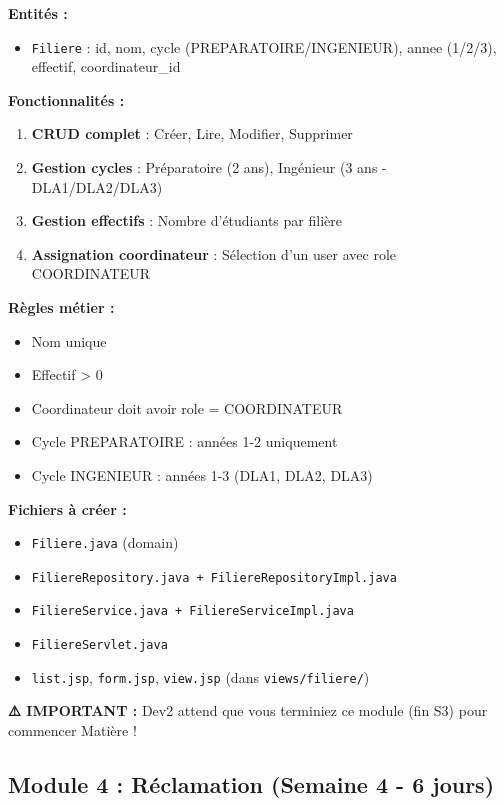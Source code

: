 \documentclass[11pt,a4paper]{article}
\begin{document}
\textbf{Entités :}
\begin{itemize}
    \item \texttt{Filiere} : id, nom, cycle (PREPARATOIRE/INGENIEUR), annee (1/2/3), effectif, coordinateur\_id
\end{itemize}

\textbf{Fonctionnalités :}
\begin{enumerate}
    \item \textbf{CRUD complet} : Créer, Lire, Modifier, Supprimer
    \item \textbf{Gestion cycles} : Préparatoire (2 ans), Ingénieur (3 ans - DLA1/DLA2/DLA3)
    \item \textbf{Gestion effectifs} : Nombre d'étudiants par filière
    \item \textbf{Assignation coordinateur} : Sélection d'un user avec role COORDINATEUR
\end{enumerate}

\textbf{Règles métier :}
\begin{itemize}
    \item Nom unique
    \item Effectif > 0
    \item Coordinateur doit avoir role = COORDINATEUR
    \item Cycle PREPARATOIRE : années 1-2 uniquement
    \item Cycle INGENIEUR : années 1-3 (DLA1, DLA2, DLA3)
\end{itemize}

\textbf{Fichiers à créer :}
\begin{itemize}
    \item \texttt{Filiere.java} (domain)
    \item \texttt{FiliereRepository.java + FiliereRepositoryImpl.java}
    \item \texttt{FiliereService.java + FiliereServiceImpl.java}
    \item \texttt{FiliereServlet.java}
    \item \texttt{list.jsp}, \texttt{form.jsp}, \texttt{view.jsp} (dans \texttt{views/filiere/})
\end{itemize}

\textbf{⚠️ IMPORTANT :} Dev2 attend que vous terminiez ce module (fin S3) pour commencer Matière !

\subsection{Module 4 : Réclamation (Semaine 4 - 6 jours)}
\end{document}
